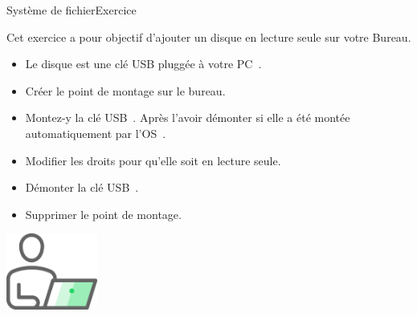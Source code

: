 \documentclass{beamer}
\begin{document}
    \begin{frame}{Système de fichier}{Exercice \execcounterdispinc}
        \setcounter{exemountcounter}{\value{execounter}}
        \addtocounter{exemountcounter}{1}
        Cet exercice a pour objectif d'ajouter un disque en lecture seule sur votre Bureau.
        \begin{itemize}
            \item Le disque est une clé USB pluggée à votre PC~.
            \item Créer le point de montage sur le bureau.
            \item Montez-y la clé USB~.
            Après l'avoir démonter si elle a été montée automatiquement par l'OS~.
            \item Modifier les droits pour qu'elle soit en lecture seule.
            \item Démonter la clé USB~.
            \item Supprimer le point de montage.
        \end{itemize}
        \bigbreak
        \centering
        \includegraphics[width=3cm]{image/guy-in-front-of-desktop}
    \end{frame}
\end{document}
